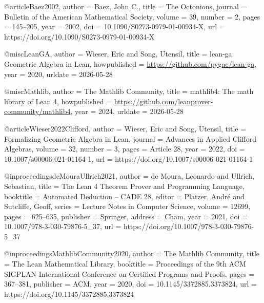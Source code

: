 \documentclass{birkjour}
\theoremstyle{plain}
\theoremstyle{definition}
\theoremstyle{remark}
\begin{document}
@article{Baez2002,
  author  = {Baez, John C.},
  title   = {The Octonions},
  journal = {Bulletin of the American Mathematical Society},
  volume  = {39},
  number  = {2},
  pages   = {145--205},
  year    = {2002},
  doi     = {10.1090/S0273-0979-01-00934-X},
  url     = {https://doi.org/10.1090/S0273-0979-01-00934-X}
}

@misc{LeanGA,
  author       = {Wieser, Eric and Song, Utensil},
  title        = {{lean-ga}: Geometric Algebra in {Lean}},
  howpublished = {\url{https://github.com/pygae/lean-ga}},
  year         = {2020},
  urldate      = {2026-05-28}
}

@misc{Mathlib,
  author       = {{The Mathlib Community}},
  title        = {{mathlib4}: The math library of {Lean} 4},
  howpublished = {\url{https://github.com/leanprover-community/mathlib4}},
  year         = {2024},
  urldate      = {2026-05-28}
}

@article{Wieser2022Clifford,
  author  = {Wieser, Eric and Song, Utensil},
  title   = {Formalizing Geometric Algebra in {Lean}},
  journal = {Advances in Applied Clifford Algebras},
  volume  = {32},
  number  = {3},
  pages   = {Article 28},
  year    = {2022},
  doi     = {10.1007/s00006-021-01164-1},
  url     = {https://doi.org/10.1007/s00006-021-01164-1}
}

@inproceedings{deMouraUllrich2021,
  author    = {de Moura, Leonardo and Ullrich, Sebastian},
  title     = {The {Lean} 4 Theorem Prover and Programming Language},
  booktitle = {Automated Deduction -- {CADE} 28},
  editor    = {Platzer, Andr{\'e} and Sutcliffe, Geoff},
  series    = {Lecture Notes in Computer Science},
  volume    = {12699},
  pages     = {625--635},
  publisher = {Springer},
  address   = {Cham},
  year      = {2021},
  doi       = {10.1007/978-3-030-79876-5_37},
  url       = {https://doi.org/10.1007/978-3-030-79876-5_37}
}

@inproceedings{MathlibCommunity2020,
  author    = {{The Mathlib Community}},
  title     = {The {Lean} Mathematical Library},
  booktitle = {Proceedings of the 9th {ACM} {SIGPLAN} International Conference
               on Certified Programs and Proofs},
  pages     = {367--381},
  publisher = {ACM},
  year      = {2020},
  doi       = {10.1145/3372885.3373824},
  url       = {https://doi.org/10.1145/3372885.3373824}
}
\endgroup
\end{document}
